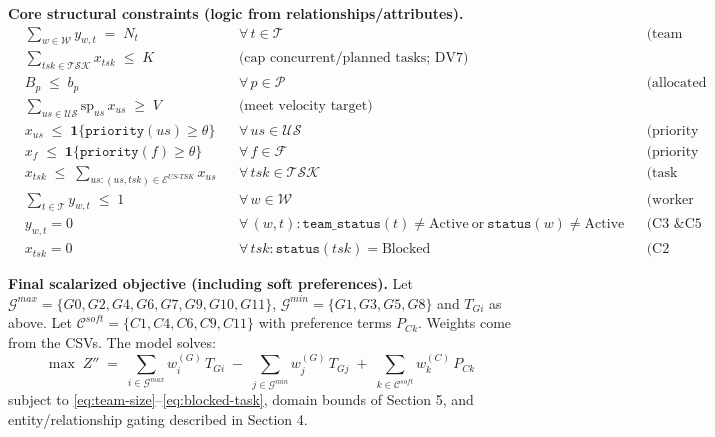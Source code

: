 \documentclass[11pt,a4paper]{article}
\begin{document}
\bigskip
\noindent\textbf{Core structural constraints (logic from relationships/attributes).}
\begin{align}
& \sum_{w\in\mathcal{W}} y_{w,t} \;=\; N_t && \forall\, t\in\mathcal{T} 
&& \text{(team size equals assigned workers; uses R2)} \label{eq:team-size}\\[4pt]
& \sum_{tsk\in\mathcal{TSK}} x_{tsk} \;\le\; K 
&& \text{(cap concurrent/planned tasks; DV7)} \label{eq:task-cap}\\[4pt]
& B_p \;\le\; b_p && \forall\, p\in\mathcal{P}
&& \text{(allocated budget within project ceiling)} \label{eq:budget}\\[4pt]
& \sum_{us\in\mathcal{US}} \text{sp}_{us}\, x_{us} \;\ge\; V 
&& \text{(meet velocity target)} \label{eq:velocity}\\[4pt]
& x_{us} \;\le\; \mathbf{1}\{\texttt{priority}(us)\ge \theta\} && \forall\, us\in\mathcal{US}
&& \text{(priority threshold; see C8)} \label{eq:prio-us}\\[4pt]
& x_{f} \;\le\; \mathbf{1}\{\texttt{priority}(f)\ge \theta\} && \forall\, f\in\mathcal{F}
&& \text{(priority threshold for features)} \label{eq:prio-f}\\[4pt]
& x_{tsk} \;\le\; \sum_{us:(us,tsk)\in \mathcal{E}^{US\text{-}TSK}} x_{us} && \forall\, tsk\in\mathcal{TSK}
&& \text{(task only if its user story is selected; R10)} \label{eq:task-implies-story}\\[4pt]
& \sum_{t\in\mathcal{T}} y_{w,t} \;\le\; 1 && \forall\, w\in\mathcal{W}
&& \text{(worker to at most one team)} \label{eq:worker-unique}\\[4pt]
& y_{w,t}=0 && \forall\, (w,t): \texttt{team\_status}(t)\neq\text{Active}\ \text{or}\ \texttt{status}(w)\neq\text{Active}
&& \text{(C3 \& C5 hard gating)} \label{eq:active-gates}\\[4pt]
& x_{tsk}=0 && \forall\, tsk: \texttt{status}(tsk)=\text{Blocked}
&& \text{(C2 gating)} \label{eq:blocked-task}
\end{align}

\bigskip
\noindent\textbf{Final scalarized objective (including soft preferences).}
Let $\mathcal{G}^{max}=\{G0,G2,G4,G6,G7,G9,G10,G11\}$, $\mathcal{G}^{min}=\{G1,G3,G5,G8\}$ and $T_{Gi}$ as above. 
Let $\mathcal{C}^{soft}=\{C1,C4,C6,C9,C11\}$ with preference terms $P_{Ck}$.
Weights come from the CSVs. The model solves:
\[
\boxed{
\max\; Z'' \;=\;
\sum_{i\in\mathcal{G}^{max}} w^{(G)}_i\, T_{Gi}
\;-\;
\sum_{j\in\mathcal{G}^{min}} w^{(G)}_j\, T_{Gj}
\;+\;
\sum_{k\in\mathcal{C}^{soft}} w^{(C)}_{k}\, P_{Ck}
}
\]
subject to \eqref{eq:team-size}--\eqref{eq:blocked-task}, domain bounds of Section 5, and entity/relationship gating described in Section 4.
\end{document}
